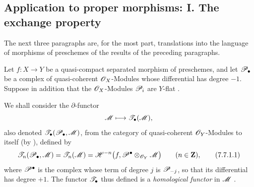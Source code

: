 \subsection{Application to proper morphisms: I. The exchange property}
\label{subsection:III.7.7}
\label{III.7.7}

The next three paragraphs are, for the most part,
translations into the language of morphisms of preschemes
of the results of the preceding paragraphs.

\begin{env}[7.7.1]
\label{III.7.7.1}
Let $f:X\to Y$ be a quasi-compact separated morphism of
preschemes, and let $\mathscr{P}_\bullet$ be a complex of
quasi-coherent $\mathscr{O}_X$-Modules whose differential has
degree $-1$.  Suppose in addition that the $\mathscr{O}_X$-Modules
$\mathscr{P}_i$ are $Y$-flat .

We shall consider the $\partial$-functor
\[
  \mathscr{M}\longmapsto\mathscr{T}_\bullet(\mathscr{M}),
\]
also denoted
$\mathscr{T}_\bullet(\mathscr{P}_\bullet,\mathscr{M})$, from the category of
quasi-coherent $\mathscr{O}_Y$-Modules to itself (by
), defined by
\[
  \mathscr{T}_n(\mathscr{P}_\bullet,\mathscr{M})
  =\mathscr{T}_n(\mathscr{M})
  =\mathscr{H}^{-n}
    \bigl(f,\mathscr{P}^\bullet\otimes_{\mathscr{O}_Y}\mathscr{M}\bigr)
  \qquad(n\in\mathbf{Z}),
  \tag{7.7.1.1}\label{III.7.7.1.1}
\]
where $\mathscr{P}^\bullet$ is the complex whose term of degree
$j$ is $\mathscr{P}_{-j}$, so that its differential has degree
$+1$.  The functor $\mathscr{T}_\bullet$ thus defined is a
\emph{homological functor} in $\mathscr{M}$ .
\end{env}

